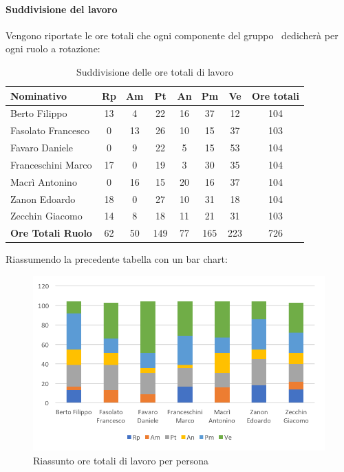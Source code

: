 \documentclass[../PianoDiProgetto_v3.0.0.tex]{subfiles}
\begin{document}
			\paragraph{Suddivisione del lavoro}
			Vengono riportate le ore totali che ogni componente del gruppo \kpanic\ dedicherà per ogni ruolo a rotazione:
			\begin{table}[h]
				\begin{tabularx}{\textwidth}{l * {6}{C} c}
				\toprule
				\textbf{Nominativo} & \textbf{Rp} & \textbf{Am} & \textbf{Pt} & \textbf{An} & \textbf{Pm} & \textbf{Ve} & \textbf{Ore totali} \\
				\midrule
				Berto Filippo &	13 & 4 & 22 & 16 & 37 & 12 & 104 \\
				Fasolato Francesco & 0 & 13 & 26 & 10 & 15 & 37 & 103 \\
				Favaro Daniele & 0 & 9 & 22 & 5 & 15 & 53 & 104 \\
				Franceschini Marco & 17 & 0 & 19 & 3 & 30 & 35 & 104 \\
				Macrì Antonino & 0 & 16 & 15 & 20 & 16 & 37 & 104 \\
				Zanon Edoardo &	18 & 0 & 27 & 10 & 31 & 18 & 104 \\
				Zecchin Giacomo & 14 & 8 & 18 & 11 & 21 & 31 & 103 \\
				\midrule			
				\textbf{Ore Totali Ruolo} & 62 & 50 & 149 & 77 & 165 & 223 & 726 \\
				\bottomrule
				\end{tabularx}
				\caption{Suddivisione delle ore totali di lavoro}		
			\end{table}

			Riassumendo la precedente tabella con un bar chart:
			\begin{figure}[!h]
				\centering
				\includegraphics[width=\textwidth]{Preventivo/Immagini/rendicontato_oreRuoloPersona.png}
				\caption{Riassunto ore totali di lavoro per persona}
			\end{figure}	
			
\end{document}
